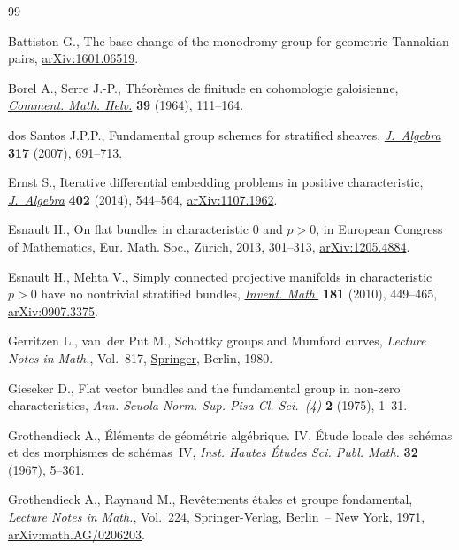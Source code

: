 \begin{thebibliography}{99}
\footnotesize\itemsep=0pt

Battiston G., The base change of the monodromy group for geometric {T}annakian
 pairs, \href{https://arxiv.org/abs/1601.06519}{arXiv:1601.06519}.

Borel A., Serre J.-P., Th\'eor\`emes de finitude en cohomologie galoisienne,
 \href{https://doi.org/10.1007/BF02566948}{\textit{Comment. Math. Helv.}} \textbf{39} (1964), 111--164.

dos Santos J.P.P., Fundamental group schemes for stratified sheaves,
 \href{https://doi.org/10.1016/j.jalgebra.2007.03.005}{\textit{J.~Algebra}} \textbf{317} (2007), 691--713.

Ernst S., Iterative differential embedding problems in positive characteristic,
 \href{https://doi.org/10.1016/j.jalgebra.2013.12.023}{\textit{J.~Algebra}} \textbf{402} (2014), 544--564, \href{https://arxiv.org/abs/1107.1962}{arXiv:1107.1962}.

Esnault H., On flat bundles in characteristic 0 and {$p>0$}, in European
 {C}ongress of {M}athematics, Eur. Math. Soc., Z\"{u}rich, 2013, 301--313,
 \href{https://arxiv.org/abs/1205.4884}{arXiv:1205.4884}.

Esnault H., Mehta V., Simply connected projective manifolds in characteristic
 {$p>0$} have no nontrivial stratified bundles, \href{https://doi.org/10.1007/s00222-010-0250-2}{\textit{Invent. Math.}}
 \textbf{181} (2010), 449--465, \href{https://arxiv.org/abs/0907.3375}{arXiv:0907.3375}.

Gerritzen L., van~der Put M., Schottky groups and {M}umford curves,
 \textit{Lecture Notes in Math.}, Vol.~817, \href{https://doi.org/10.1007/BFb0089957}{Springer}, Berlin, 1980.

Gieseker D., Flat vector bundles and the fundamental group in non-zero
 characteristics, \textit{Ann. Scuola Norm. Sup. Pisa Cl. Sci.~(4)} \textbf{2}
 (1975), 1--31.

Grothendieck A., \'El\'ements de g\'eom\'etrie alg\'ebrique. {IV}. \'Etude
 locale des sch\'emas et des morphismes de sch\'emas~{IV}, \textit{Inst.
 Hautes \'Etudes Sci. Publ. Math.} \textbf{32} (1967), 5--361.

Grothendieck A., Raynaud M., Rev\^etements \'etales et groupe fondamental,
 \textit{Lecture Notes in Math.}, Vol.~224, \href{http://dx.doi.org/10.1007/BFb0058656}{Springer-Verlag}, Berlin~-- New
 York, 1971, \href{https://arxiv.org/abs/math.AG/0206203}{arXiv:math.AG/0206203}.


\end{thebibliography}
